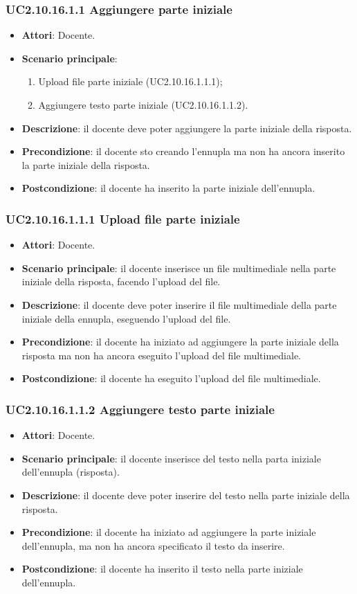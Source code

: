 \subsubsection{UC2.10.16.1.1 Aggiungere parte iniziale}
\begin{itemize}
\item \textbf{Attori}: Docente.
\item \textbf{Scenario principale}:
\begin{enumerate}
\item Upload file parte iniziale (UC2.10.16.1.1.1);
\item Aggiungere testo parte iniziale (UC2.10.16.1.1.2).
\end{enumerate}
\item \textbf{Descrizione}: il docente deve poter aggiungere la parte iniziale della risposta.
\item \textbf{Precondizione}: il docente sto creando l'ennupla ma non ha ancora inserito la parte iniziale della risposta.
\item \textbf{Postcondizione}: il docente ha inserito la parte iniziale dell'ennupla.
\end{itemize}
\subsubsection{UC2.10.16.1.1.1 Upload file parte iniziale}
\begin{itemize}
\item \textbf{Attori}: Docente.
\item \textbf{Scenario principale}: il docente inserisce un file multimediale nella parte iniziale della risposta, facendo l'upload del file.
\item \textbf{Descrizione}: il docente deve poter inserire il file multimediale della parte iniziale della ennupla, eseguendo l'upload del file.
\item \textbf{Precondizione}: il docente ha iniziato ad aggiungere la parte iniziale della risposta ma non ha ancora eseguito l'upload del file multimediale.
\item \textbf{Postcondizione}: il docente ha eseguito l'upload del file multimediale.
\end{itemize}
\subsubsection{UC2.10.16.1.1.2 Aggiungere testo parte iniziale}
\begin{itemize}
\item \textbf{Attori}: Docente.
\item \textbf{Scenario principale}: il docente inserisce del testo nella parta iniziale dell'ennupla (risposta).
\item \textbf{Descrizione}: il docente deve poter inserire del testo nella parte iniziale della risposta.
\item \textbf{Precondizione}: il docente ha iniziato ad aggiungere la parte iniziale dell'ennupla, ma non ha ancora specificato il testo da inserire.
\item \textbf{Postcondizione}: il docente ha inserito il testo nella parte iniziale dell'ennupla.
\end{itemize}
